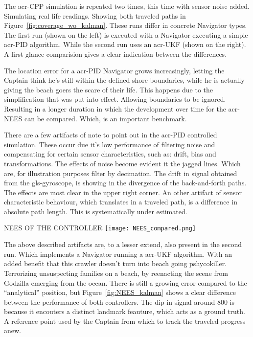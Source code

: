 The \gls{acr-CPP} simulation is repeated two times, this time with sensor noise added. Simulating real life readings.
Showing both traveled paths in Figure~\ref{fig:coverage_wo_kalman}. These runs differ in concrete Navigator types. The 
first run (shown on the left) is executed with a Navigator executing a simple \gls{acr-PID} algorithm. While the 
second run uses an \gls{acr-UKF} (shown on the right). A first glance comparision gives a clear indication between the 
differences.

The location error for a \gls{acr-PID} Navigator grows increasingly, letting the Captain think he's still within 
the defined shore boundaries, while he is actually giving the beach goers the scare of their life. This happens due 
to the simplification that was put into effect. Allowing boundaries to be ignored. Resulting in a longer duration in 
which the development over time for the \gls{acr-NEES} can be compared. Which, is an important benchmark.

There are a few artifacts of note to point out in the \gls{acr-PID} controlled simulation. These occur due it's 
low performance of filtering noise and compensating for certain sensor characteristics, such as: drift, bias and 
transformations. The effects of noise become evident it the jagged lines. Which are, for illustration purposes 
filter by decimation. The drift in signal obtained from the \gls{gls-gyroscope}, is showing in the divergence 
of the back-and-forth paths. The effects are most clear in the upper right corner. An other artifact of sensor 
characteristic behaviour, which translates in a traveled path, is a difference in absolute path length. This is 
systematically under estimated.

\begin{RoyalFigure}[htb, label=fig:NEES_kalman]{NEES OF THE CONTROLLER}
    \texttt{[image: NEES\_compared.png]}
\end{RoyalFigure}

The above described artifacts are, to a lesser extend, also present in the second run. Which implements a 
Navigator running a \gls{acr-UKF} algorithm. With an added benefit that this crawler doesn't turn into beach going 
pshycokiller. Terrorizing unsuspecting families on a beach, by reenacting the scene from Godzilla emerging from the 
ocean. There is still a growing error compared to the ``analytical'' position, but Figure~\ref{fig:NEES_kalman} 
shows a clear difference between the performance of both controllers. The dip in signal around \( 800 \) is because 
it encouters a distinct landmark feauture, which acts as a ground truth. A reference point used by the Captain from 
which to track the traveled progress anew.